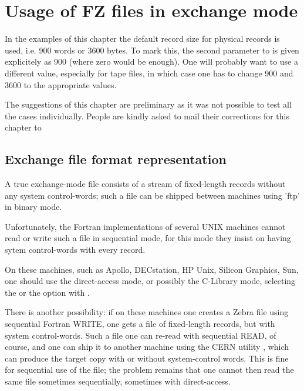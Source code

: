 
\chapter{Usage of FZ files in exchange mode}
\label{sec:H1FZ-exchange-mode}

In the examples of this chapter the default record size
for physical records is used, i.e. 900 words or 3600 bytes.
To mark this, the second parameter to  is given explicitely
as 900 (where zero would be enough).
One will probably want to use a different value,
especially for tape files,
in which case one has to change 900 and 3600 to the appropriate values.

The suggestions of this chapter are preliminary as it was not
possible to test all the cases individually.
People are kindly asked to mail their corrections for
this chapter to 

\section{Exchange file format representation}

A true exchange-mode file consists of a stream of fixed-length
records without any system control-words;
such a file can be shipped between machines using 'ftp'
in binary mode.

Unfortunately, the Fortran implementations of several UNIX
machines cannot read or write such a file in sequential mode,
for this mode they insist on having sytem control-words
with every record.

On these machines,
such as Apollo, DECstation, HP Unix, Silicon Graphics, Sun,
one should use the direct-access mode, or possibly the C-Library mode,
selecting the  or the  option with .

There is another possibility:
if on these machines one creates a Zebra file using sequential
Fortran WRITE, one gets a file of fixed-length records,
but with system control-words.
Such a file one can re-read with sequential READ, of course,
and one can ship it to another machine using the CERN utility ,
which can produce the target copy with or without system-control words.
This is fine for sequential use of the file;
the problem remains that one cannot then read the same file
sometimes sequentially, sometimes with direct-access.


